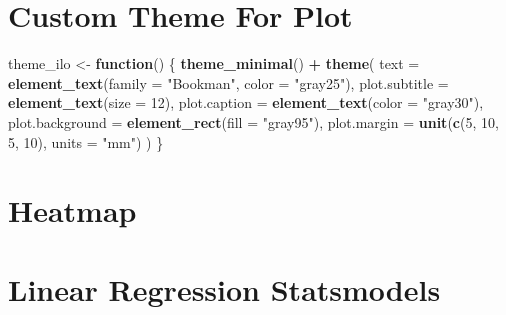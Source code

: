 \documentclass[]{book}
\newenvironment{Shaded}{\begin{snugshade}}{\end{snugshade}}
\newcommand{\KeywordTok}[1]{\textcolor[rgb]{0.13,0.29,0.53}{\textbf{#1}}}
\newcommand{\DataTypeTok}[1]{\textcolor[rgb]{0.13,0.29,0.53}{#1}}
\newcommand{\DecValTok}[1]{\textcolor[rgb]{0.00,0.00,0.81}{#1}}
\newcommand{\StringTok}[1]{\textcolor[rgb]{0.31,0.60,0.02}{#1}}
\newcommand{\OtherTok}[1]{\textcolor[rgb]{0.56,0.35,0.01}{#1}}
\newcommand{\ControlFlowTok}[1]{\textcolor[rgb]{0.13,0.29,0.53}{\textbf{#1}}}
\newcommand{\OperatorTok}[1]{\textcolor[rgb]{0.81,0.36,0.00}{\textbf{#1}}}
\newcommand{\NormalTok}[1]{#1}
\begin{document}
\section{Custom Theme For Plot}\label{custom-theme-for-plot}

\begin{Shaded}
\begin{Highlighting}[]
\NormalTok{theme_ilo <-}\StringTok{ }\ControlFlowTok{function}\NormalTok{() \{}
    \KeywordTok{theme_minimal}\NormalTok{() }\OperatorTok{+}
\StringTok{        }\KeywordTok{theme}\NormalTok{(}
            \DataTypeTok{text =} \KeywordTok{element_text}\NormalTok{(}\DataTypeTok{family =} \StringTok{"Bookman"}\NormalTok{, }\DataTypeTok{color =} \StringTok{"gray25"}\NormalTok{),}
            \DataTypeTok{plot.subtitle =} \KeywordTok{element_text}\NormalTok{(}\DataTypeTok{size =} \DecValTok{12}\NormalTok{),}
            \DataTypeTok{plot.caption =} \KeywordTok{element_text}\NormalTok{(}\DataTypeTok{color =} \StringTok{"gray30"}\NormalTok{),}
            \DataTypeTok{plot.background =} \KeywordTok{element_rect}\NormalTok{(}\DataTypeTok{fill =} \StringTok{"gray95"}\NormalTok{),}
            \DataTypeTok{plot.margin =} \KeywordTok{unit}\NormalTok{(}\KeywordTok{c}\NormalTok{(}\DecValTok{5}\NormalTok{, }\DecValTok{10}\NormalTok{, }\DecValTok{5}\NormalTok{, }\DecValTok{10}\NormalTok{), }\DataTypeTok{units =} \StringTok{"mm"}\NormalTok{)}
\NormalTok{        )}
\NormalTok{\}}
\end{Highlighting}
\end{Shaded}

\section{Heatmap}\label{heatmap}

\begin{Shaded}
\end{Shaded}

\section{Linear Regression
Statsmodels}\label{linear-regression-statsmodels}
\end{document}
